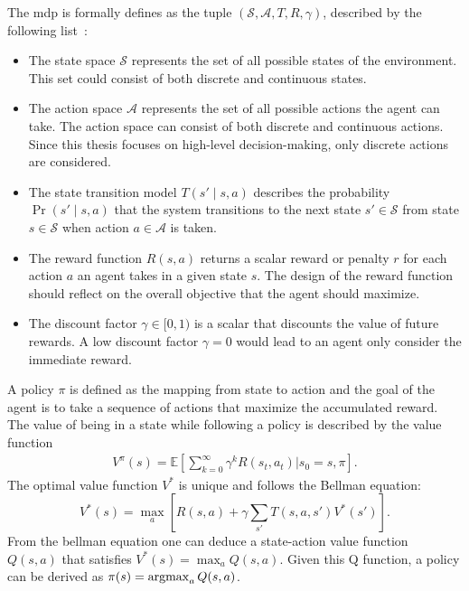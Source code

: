 The \gls{mdp} is formally defines as the tuple $( \mathcal{S}, \mathcal{A}, T, R, \gamma )$, described by the following list~\cite{Kochenderfer2015}:
\begin{itemize}
    \item The state space $\mathcal{S}$ represents the set of all possible states of the environment. This set could consist of both discrete and continuous states.
    \item The action space $\mathcal{A}$ represents the set of all possible actions the agent can take. The action space can  consist of both discrete and continuous actions. Since this thesis focuses on high-level decision-making, only discrete actions are considered.
    \item The state transition model $T(s' \mid s,a)$ describes the probability $\Pr(s' \mid s,a)$ that the system transitions to the next state $s' \in \mathcal{S}$ from state $s \in \mathcal{S}$ when action $a \in \mathcal{A}$ is taken.
    \item The reward function $R(s,a)$ returns a scalar reward or penalty $r$ for each action $a$ an agent takes in a given state $s$. The design of the reward function should reflect on the overall objective that the agent should maximize.
    \item The discount factor $\gamma \in [0,1)$ is a scalar that discounts the value of future rewards. A low discount factor $\gamma = 0$ would lead to an agent only consider the immediate reward.
\end{itemize}

A policy $\pi$ is defined as the mapping from state to action and the goal of the agent is to take a sequence of actions that maximize the accumulated reward. The value of being in a state while following a policy is described by the value function
\begin{align}
    V^\pi(s) = \mathbb{E} \left[ \sum_{k=0}^\infty \gamma^k R(s_t, a_t) | s_0 = s, \pi \right].
\end{align}
The optimal value function $V^*$ is unique and follows the Bellman equation: 
\begin{equation}
    V^*(s)= \max_{a} \left[ R(s, a) + \gamma \sum_{s'} T(s,a,s') V^*(s') \right].
    \label{eq:bellman}
\end{equation}
From the bellman equation one can deduce a state-action value function $Q(s,a)$ that satisfies $V^*(s)=\max_a Q(s,a)$. Given this Q function, a policy can be derived as $\pi(s) = \operatorname*{argmax}_a Q(s,a)$. 

